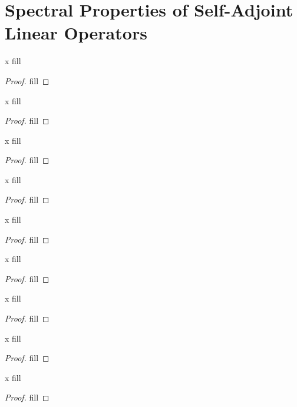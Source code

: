 \section{Spectral Properties of Self-Adjoint Linear Operators}


\begin{exercise}{x}
fill
\end{exercise}
\begin{proof}
fill
\end{proof} 

\begin{exercise}{x}
fill
\end{exercise}
\begin{proof}
fill
\end{proof} 

\begin{exercise}{x}
fill
\end{exercise}
\begin{proof}
fill
\end{proof} 

\begin{exercise}{x}
fill
\end{exercise}
\begin{proof}
fill
\end{proof} 

\begin{exercise}{x}
fill
\end{exercise}
\begin{proof}
fill
\end{proof} 

\begin{exercise}{x}
fill
\end{exercise}
\begin{proof}
fill
\end{proof} 

\begin{exercise}{x}
fill
\end{exercise}
\begin{proof}
fill
\end{proof} 

\begin{exercise}{x}
fill
\end{exercise}
\begin{proof}
fill
\end{proof} 

\begin{exercise}{x}
fill
\end{exercise}
\begin{proof}
fill
\end{proof} 

